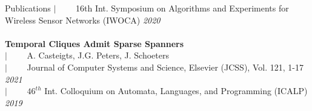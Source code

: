 \documentclass[french]{resume} %
\begin{document}
\begin{rSection}{Publications }
		$| \qquad$ {\small 16th Int. Symposium on Algorithms and Experiments for Wireless Sensor Networks (IWOCA)} \hfill {\em 2020}
		\\
		\\
		{\bf Temporal Cliques Admit Sparse Spanners}\\
		$| \qquad$ A. Casteigts, J.G. Peters, J. Schoeters\\
		$| \qquad$ Journal of Computer Systems and Science, Elsevier (JCSS), Vol. 121, 1-17 \hfill {\em 2021}\\
		$| \qquad$ $46^{th}$ Int. Colloquium on Automata, Languages, and Programming (ICALP) \hfill {\em 2019}
	\end{rSection}
	
\end{document}
